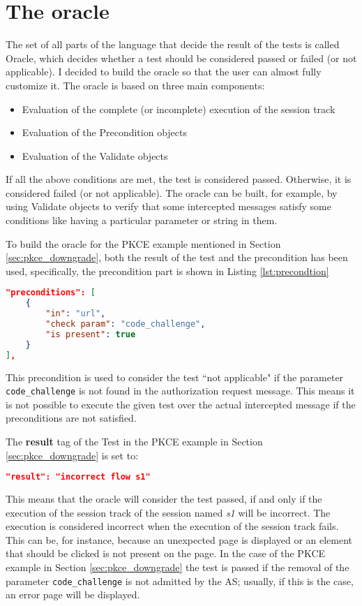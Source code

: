 \section{The oracle}
The set of all parts of the language that decide the result of the tests is called Oracle,
which decides whether a test should be considered passed or failed (or not applicable). I decided to build the oracle so that the user can almost fully customize it. 
The oracle is based on three main components:
\begin{itemize}
    \item Evaluation of the complete (or incomplete) execution of the \gls{session track} 
    \item Evaluation of the Precondition objects
    \item Evaluation of the Validate objects
\end{itemize}
If all the above conditions are met, the test is considered passed. Otherwise, it is considered failed (or not applicable).
The oracle can be built, for example, by using Validate objects to verify that some intercepted messages satisfy some conditions like having a particular parameter or string in them.

To build the oracle for the \gls{PKCE} example mentioned in Section \ref{sec:pkce_downgrade}, both the result of the test and the precondition has been used, specifically, the precondition part is shown in Listing \ref{lst:precondtion}
\begin{lstlisting}[language=json, caption=Precondition definition, label={lst:precondtion}]
"preconditions": [
    {
        "in": "url",
        "check param": "code_challenge",
        "is present": true
    }
],
\end{lstlisting}
This precondition is used to consider the test ``not applicable" if the parameter \texttt{code\_challenge} is not found in the authorization request message. This means it is not possible to execute the given test over the actual intercepted message if the preconditions are not satisfied.

The \textbf{result} tag of the Test in the \gls{PKCE} example in Section \ref{sec:pkce_downgrade} is set to:
\begin{lstlisting}[language=json]
"result": "incorrect flow s1"
\end{lstlisting}
This means that the oracle will consider the test passed, if and only if the execution of the \gls{session track} of the session named \textit{s1} will be incorrect. The execution is considered incorrect when the execution of the \gls{session track} fails. This can be, for instance, because an unexpected page is displayed or an element that should be clicked is not present on the page. In the case of the PKCE example in Section \ref{sec:pkce_downgrade} the test is passed if the removal of the parameter \texttt{code\_challenge} is not admitted by the AS; usually, if this is the case, an error page will be displayed.

